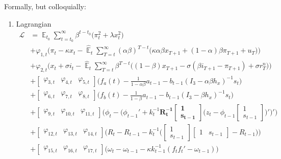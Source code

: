 \documentclass[11pt]{article}
\renewcommand{\[}{\begin{equation}}
\renewcommand{\]}{\end{equation}}
\DeclareMathOperator{\E}{\mathbb{E}}
\begin{document}
Formally, but colloquially:
\begin{enumerate}
\item Lagrangian
\begin{align}
\mathcal{L} &= \E_{t_0}\sum_{t=t_0}^{\infty} \beta^{t-t_0}\bigg( \pi_t^2  + \lambda x_t^2 \bigg)  \\
 & + \varphi_{1,t} \bigg(\pi_t - \kappa x_t -\hat{\E}_t \sum_{T=t}^{\infty} (\alpha\beta)^{T-t }\big( \kappa \alpha \beta x_{T+1} + (1-\alpha)\beta \pi_{T+1} + u_T\big)\bigg) \\
 & + \varphi_{2,t} \bigg(x_t + \sigma i_t -\hat{\E}_t \sum_{T=t}^{\infty} \beta^{T-t }\big( (1-\beta)x_{T+1} - \sigma(\beta i_{T+1} - \pi_{T+1}) +\sigma r_T^n \big) \bigg) \\
 & + \begin{bmatrix} \varphi_{3,t} & \varphi_{4,t} & \varphi_{5,t} \end{bmatrix} \bigg(f_a(t) - \frac{1}{1-\alpha\beta}a_{t-1}  - b_{t-1}(I_3 - \alpha\beta h_x)^{-1}s_t  \bigg) \\
 & + \begin{bmatrix} \varphi_{6,t} & \varphi_{7,t} & \varphi_{8,t} \end{bmatrix} \bigg(f_b(t) - \frac{1}{1-\beta}a_{t-1}  - b_{t-1}(I_3 - \beta h_x)^{-1}s_t \bigg)  \\
  & + \begin{bmatrix} \varphi_{9,t} & \varphi_{10,t} & \varphi_{11,t} \end{bmatrix} \bigg( \phi_t   - \bigg( \phi_{t-1}' + k_t^{-1} \mathbf{R_t^{-1}}\begin{bmatrix} \mathbf{1} \\ \mathbf{s_{t-1}} \end{bmatrix}\bigg(z_{t} - \phi_{t-1} \begin{bmatrix} 1 \\ s_{t-1} \end{bmatrix} \bigg)' \bigg)'  \bigg)  \\
  & + \begin{bmatrix} \varphi_{12,t} & \varphi_{13,t} & \varphi_{14,t} \end{bmatrix} \bigg( R_t - R_{t-1} -  k_t^{-1} \bigg( \begin{bmatrix} 1 \\ s_{t-1} \end{bmatrix} \begin{bmatrix} 1 & s_{t-1} \end{bmatrix}  - R_{t-1} \bigg) \bigg)  \\
  & + \begin{bmatrix} \varphi_{15,t} & \varphi_{16,t} & \varphi_{17,t} \end{bmatrix} \bigg( \omega_t -  \omega_{t-1} - \kappa k_{t-1}^{-1}(f_t f_t'  -\omega_{t-1}) \bigg)  \\

\end{align}
\end{enumerate}
\end{document}
